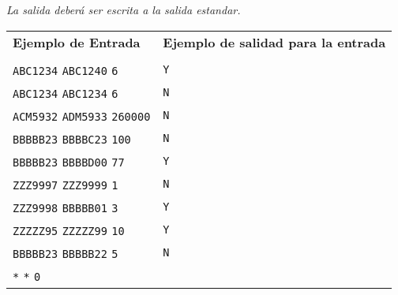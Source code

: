 \documentclass[a4paper,10pt]{article}
\begin{document}
\emph{La salida deberá ser escrita a la salida estandar.}\\

\begin{tabular}{|l|l|}
  \hline
  \textbf{Ejemplo de Entrada}&\textbf{Ejemplo de salidad para la entrada}\\
   &\\
  \verb|ABC1234| \verb|ABC1240| \verb|6| & \verb|Y| \\     
  \verb|ABC1234| \verb|ABC1234| \verb|6| & \verb|N| \\     
  \verb|ACM5932| \verb|ADM5933| \verb|260000| & \verb|N| \\     
  \verb|BBBBB23| \verb|BBBBC23| \verb|100| & \verb|N| \\     
  \verb|BBBBB23| \verb|BBBBD00| \verb|77| & \verb|Y| \\     
  \verb|ZZZ9997| \verb|ZZZ9999| \verb|1| & \verb|N| \\     
  \verb|ZZZ9998| \verb|BBBBB01| \verb|3| & \verb|Y| \\     
  \verb|ZZZZZ95| \verb|ZZZZZ99| \verb|10| & \verb|Y| \\     
  \verb|BBBBB23| \verb|BBBBB22| \verb|5| & \verb|N| \\     
  \verb|*| \verb|*| \verb|0| &  \\     
  \hline
\end{tabular}
\end{document}
